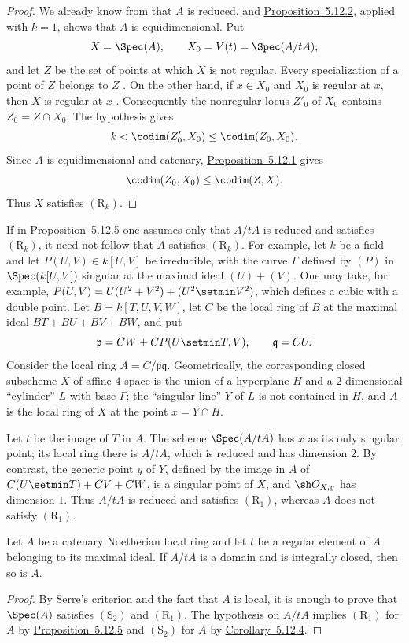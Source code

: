 \begin{proof}
We already know from  that $A$ is reduced, and
{\hyperref[IV.5.12.2]{Proposition~5.12.2}}, applied with $k=1$, shows that $A$ is
equidimensional.  Put
\[
  X=\Spec(A),\qquad X_0=V(t)=\Spec(A/tA),
\]
and let $Z$ be the set of points at which $X$ is not regular.
Every specialization of a point of $Z$ belongs to $Z$
.  On the other hand, if $x\in X_0$ and $X_0$
is regular at $x$, then $X$ is regular at $x$
.  Consequently the nonregular locus $Z'_0$
of $X_0$ contains $Z_0=Z\cap X_0$.  The hypothesis gives
\[
  k<\codim(Z'_0,X_0)\leq\codim(Z_0,X_0).
\]
Since $A$ is equidimensional and catenary, {\hyperref[IV.5.12.1]{Proposition~5.12.1}}
gives
\[
  \codim(Z_0,X_0)\leq\codim(Z,X).
\]
Thus $X$ satisfies $(\mathrm R_k)$.
\end{proof}

\begin{remark}[5.12.6]
\label{IV.5.12.6}
If in {\hyperref[IV.5.12.5]{Proposition~5.12.5}} one assumes only that $A/tA$ is reduced
and satisfies $(\mathrm R_k)$, it need not follow that $A$
satisfies $(\mathrm R_k)$.  For example, let $k$ be a field and
let $P(U,V)\in k[U,V]$ be irreducible, with the curve $\Gamma$
defined by $(P)$ in $\Spec(k[U,V])$ singular at the maximal ideal
$(U)+(V)$.  One may take, for example, $P(U,V)=U(U^2+V^2)+(U^2\setmin V^2)$,
which defines a cubic with a double point.  Let
$B=k[T,U,V,W]$, let $C$ be the local ring of $B$ at the maximal
ideal $BT+BU+BV+BW$, and put
\[
  \mathfrak p=CW+CP(U\setmin T,V),\qquad \mathfrak q=CU.
\]
Consider the local ring $A=C/\mathfrak p\mathfrak q$.
Geometrically, the corresponding closed subscheme $X$ of affine
$4$-space is the union of a hyperplane $H$ and a
$2$-dimensional ``cylinder'' $L$ with base $\Gamma$; the
``singular line'' $Y$ of $L$ is not contained in $H$, and $A$ is
the local ring of $X$ at the point $x=Y\cap H$.

Let $t$ be the image of $T$ in $A$.  The scheme
$\Spec(A/tA)$ has $x$ as its only singular point; its local ring
there is $A/tA$, which is reduced and has dimension $2$.  By
contrast, the generic point $y$ of $Y$, defined by the image in
$A$ of $C(U\setmin T)+CV+CW$,
is a singular point of $X$, and $\sh O_{X,y}$ has dimension $1$.
Thus $A/tA$ is reduced and satisfies $(\mathrm R_1)$, whereas
$A$ does not satisfy $(\mathrm R_1)$.
\end{remark}


\begin{corollary}[5.12.7]
\label{IV.5.12.7}
Let $A$ be a catenary Noetherian local ring and let $t$ be a
regular element of $A$ belonging to its maximal ideal.  If
$A/tA$ is a domain and is integrally closed, then so is $A$.
\end{corollary}

\begin{proof}
By Serre's criterion  and the fact that $A$ is
local, it is enough to prove that $\Spec(A)$ satisfies
$(\mathrm S_2)$ and $(\mathrm R_1)$.  The hypothesis on $A/tA$
implies $(\mathrm R_1)$ for $A$ by {\hyperref[IV.5.12.5]{Proposition~5.12.5}} and
$(\mathrm S_2)$ for $A$ by {\hyperref[IV.5.12.4]{Corollary~5.12.4}}.
\end{proof}
